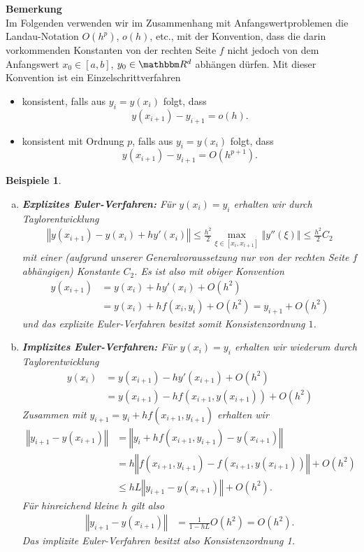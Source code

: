 \documentclass[12pt,a4paper]{book}
\theoremstyle{break}
\newtheorem{beispiele}[theorem]{Beispiele}
\theoremstyle{nonumberplain}
\newcommand{\R}{\mathbbm R}
\newcommand{\norm}[1]{\left\Vert#1\right\Vert}		%
\newcommand{\1}{\mathbbm{1}} 			      	%
\begin{document}
\medskip
\textbf{Bemerkung}\\
Im Folgenden verwenden wir im Zusammenhang mit Anfangswertproblemen
die Landau-Notation $O(h^p)$, $o(h)$, etc., mit der Konvention, dass
die darin vorkommenden Konstanten von der rechten Seite $f$ nicht jedoch von dem Anfangswert $x_0\in [a,b]$, $y_0\in \R^d$
abhängen dürfen. Mit dieser Konvention ist ein Einzelschrittverfahren
\begin{itemize}
\item konsistent, falls aus $y_i=y(x_i)$ folgt, dass 
\[
y(x_{i+1})-y_{i+1}=o(h).
\]
\item konsistent mit Ordnung $p$, falls aus $y_i=y(x_i)$ folgt, dass 
\[
y(x_{i+1})-y_{i+1}=O(h^{p+1}).
\]
\end{itemize}

\medskip

\begin{beispiele}
\begin{enumerate}[(a)]
\item \textbf{Explizites Euler-Verfahren:} Für $y(x_i)=y_i$ erhalten wir durch Taylorentwicklung
\begin{align*}
\norm{y(x_{i+1}) - y(x_i)+h y'(x_i)}
\leq \frac{h^2}{2} \max_{\xi\in [x_i,x_{i+1}]} \norm{y''(\xi)}\leq \frac{h^2}{2} C_2
\end{align*}
mit einer (aufgrund unserer Generalvoraussetzung nur von der rechten Seite $f$ abhängigen) Konstante $C_2$. Es ist also mit obiger Konvention
\begin{align*}
y(x_{i+1}) &= y(x_i)+h y'(x_i) + O(h^2)\\
&= y(x_i)+h f(x_i,y_i) + O(h^2) = y_{i+1} + O(h^2)
\end{align*}
und das explizite Euler-Verfahren besitzt somit Konsistenzordnung $1$.
%
\item \textbf{Implizites Euler-Verfahren:} Für $y(x_i)=y_i$ erhalten wir wiederum durch Taylorentwicklung
\begin{align*}
y(x_i) &=y(x_{i+1})- h y'(x_{i+1}) + O(h^2)\\
       &=y(x_{i+1})- h f(x_{i+1},y(x_{i+1})) + O(h^2)
\end{align*}
Zusammen mit $y_{i+1}=y_i+hf(x_{i+1},y_{i+1})$ erhalten wir
\begin{align*}
\norm{y_{i+1}-y(x_{i+1})} &= \norm{ y_i+h f(x_{i+1},y_{i+1}) - y(x_{i+1})}\\
&= h \norm{ f(x_{i+1},y_{i+1})-f(x_{i+1},y(x_{i+1})) } + O(h^2)\\
& \leq h L \norm{ y_{i+1}-y(x_{i+1})}+ O(h^2).
\end{align*}
Für hinreichend kleine $h$ gilt also
\begin{align*}
\norm{y_{i+1}-y(x_{i+1})} &= \frac{1}{1-hL} O(h^2)=O(h^2).
\end{align*}
Das implizite Euler-Verfahren besitzt also Konsistenzordnung 1.
\end{enumerate}
\end{beispiele}
\end{document}
